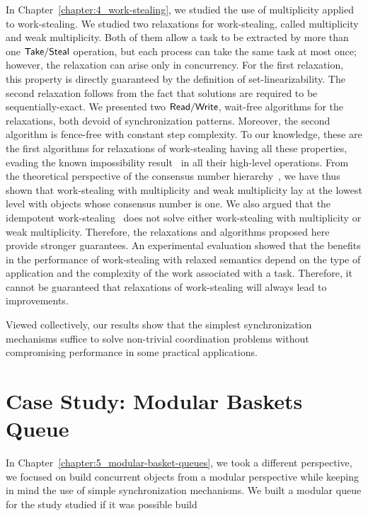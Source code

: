 In Chapter~\ref{chapter:4_work-stealing}, we studied the use of multiplicity applied to work-stealing. We studied two relaxations for work-stealing, called multiplicity and weak multiplicity. Both of them allow a task to be extracted by more than one ${\sf Take}/{\sf Steal}$ operation, but each process can take the same task at most once; however, the relaxation can arise only in concurrency. For the first relaxation, this property is directly guaranteed by the definition of set-linearizability. The second relaxation follows from the fact that solutions are required to be sequentially-exact. We presented two ${\sf Read}/{\sf Write}$, wait-free algorithms for the relaxations, both devoid of \RAW synchronization patterns.
Moreover, the second algorithm is fence-free with constant step complexity. To our knowledge, these are the first algorithms for relaxations of work-stealing having all these properties, evading the known impossibility result~\cite{DBLP_conf_popl_AttiyaGHKMV11} in all their high-level operations. From the theoretical perspective of the consensus number hierarchy~\cite{DBLP_journals_toplas_Herlihy91}, we have thus shown that work-stealing with multiplicity and weak multiplicity lay at the lowest level with objects whose consensus number is one. We also argued that the idempotent work-stealing~\cite{maged.vechev.2009} does not solve either work-stealing with multiplicity or weak multiplicity. Therefore, the relaxations and algorithms proposed here provide stronger guarantees. An experimental evaluation showed that the benefits in the performance of work-stealing with relaxed semantics depend on the type of application and the complexity of the work associated with a task. Therefore, it cannot be guaranteed that relaxations of work-stealing will always lead to improvements.

Viewed collectively, our results show that the simplest synchronization mechanisms suffice to solve non-trivial coordination problems without compromising performance in some practical applications.

\section{Case Study: Modular Baskets Queue}

In Chapter~\ref{chapter:5_modular-basket-queues}, we took a different perspective, we focused on build concurrent objects from a modular perspective while keeping in mind the use of simple synchronization mechanisms. We built a modular queue    for the study studied if it was possible build

